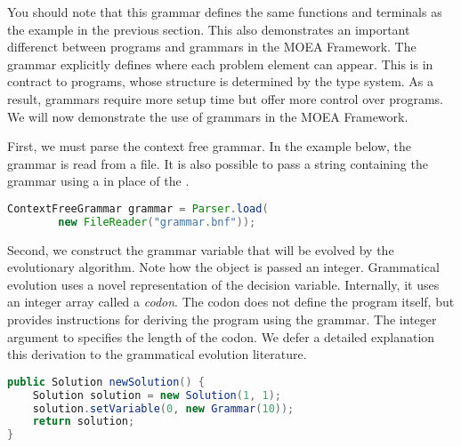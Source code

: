 You should note that this grammar defines the same functions and terminals as the example in the previous section.  This also demonstrates an important differenct between programs and grammars in the MOEA Framework.  The grammar explicitly defines where each problem element can appear.  This is in contract to programs, whose structure is determined by the type system.  As a result, grammars require more setup time but offer more control over programs.  We will now demonstrate the use of grammars in the MOEA Framework.

First, we must parse the context free grammar.  In the example below, the grammar is read from a file.  It is also possible to pass a string containing the grammar using a  in place of the .
\begin{lstlisting}[language=Java]
    ContextFreeGrammar grammar = Parser.load(
        new FileReader("grammar.bnf"));
\end{lstlisting}

Second, we construct the grammar variable that will be evolved by the evolutionary algorithm.  Note how the  object is passed an integer.  Grammatical evolution uses a novel representation of the decision variable.  Internally, it uses an integer array called a \emph{codon}.  The codon does not define the program itself, but provides instructions for deriving the program using the grammar.  The integer argument to  specifies the length of the codon.  We defer a detailed explanation this derivation to the grammatical evolution literature.
\begin{lstlisting}[language=Java]
public Solution newSolution() {
    Solution solution = new Solution(1, 1);
    solution.setVariable(0, new Grammar(10));
    return solution;
}
\end{lstlisting}

